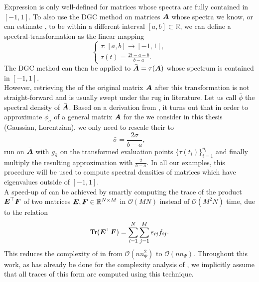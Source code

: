 Expression  is only well-defined for matrices whose spectra are fully
contained in $[-1, 1]$. To also use the \gls{DGC} method on matrices $\boldsymbol{A}$ whose
spectra we know, or can estimate \cite{lin2016review, zhou2011spectrum}, to be
within a different interval $[a, b] \subset \mathbb{R}$,
we can define a \gls{spectral-transformation} as the linear mapping
\begin{equation}
    \begin{cases}
        \tau : [a, b] \to [-1, 1], \\
        \tau(t) = \frac{2t - a - b}{b - a}.
    \end{cases}
    \label{equ:2-chebyshev-spectral-transformation}
\end{equation}
The \gls{DGC} method can then be applied to $\bar{\boldsymbol{A}} = \tau(\boldsymbol{A})$ whose
spectrum is contained in $[-1, 1]$.\\

However, retrieving the  of the original
matrix $\boldsymbol{A}$ after this transformation is not straight-forward
and is usually swept under the rug in literature.
Let us call $\bar{\phi}$ the spectral density of $\bar{\boldsymbol{A}}$.
Based on a derivation from , it turns out that in order
to approximate $\phi_{\sigma}$ of a general matrix $\boldsymbol{A}$
for the  we consider
in this thesis (Gaussian, Lorentzian), we only need to rescale their
 to
\begin{equation}
    \bar{\sigma} = \frac{2\sigma}{b - a},
    \label{equ:2-chebyshev-sigma-transformation}
\end{equation}
run  on $\bar{\boldsymbol{A}}$ with $g_{\bar{\sigma}}$
on the transformed evaluation points $\{ \tau(t_i) \}_{i=1}^{n_t}$ and finally
multiply the resulting approximation with $\frac{2}{b-a}$.
In all our examples, this procedure will be used to compute spectral densities
of matrices which have eigenvalues outside of $[-1, 1]$.\\

A speed-up of  can be achieved by smartly computing the trace of the 
product $\boldsymbol{E}^{\top}\boldsymbol{F}$ of two matrices $\boldsymbol{E}, \boldsymbol{F} \in \mathbb{R}^{N \times M}$ in
$\mathcal{O}(MN)$ instead of $\mathcal{O}(M^2N)$ time, due to the relation
\begin{equation}
    \operatorname{Tr}(\boldsymbol{E}^{\top}\boldsymbol{F}) = \sum_{i=1}^{N} \sum_{j=1}^{M} e_{ij} f_{ij}.
    \label{equ:2-chebyshev-fast-trace}
\end{equation}
This reduces the complexity of 
in  from $\mathcal{O}(nn_{\Psi}^2)$ to $\mathcal{O}(nn_{\Psi})$.
Throughout this work, as has already be done for the complexity analysis
of , we implicitly assume that all traces of this
form are computed using this technique.

